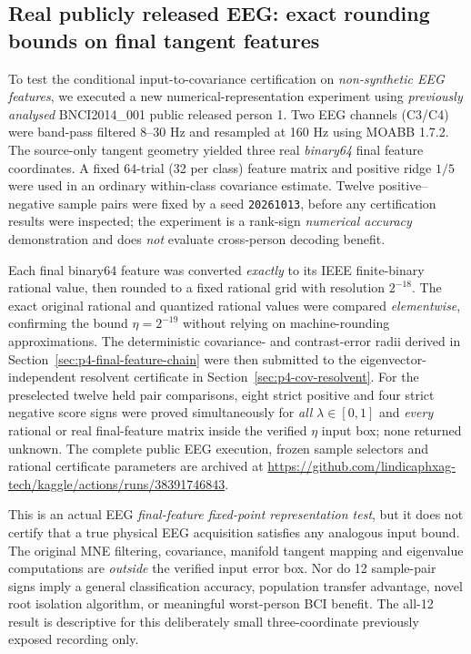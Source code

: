\subsection{Real publicly released EEG: exact rounding bounds on final tangent features}
\label{sec:p4-real-feature-quantisation}
To test the conditional input-to-covariance certification
on \emph{non-synthetic EEG features}, we executed a
new numerical-representation experiment using
\emph{previously analysed} BNCI2014\_001
public released person 1.
Two EEG channels (C3/C4) were band-pass filtered
8--30 Hz and resampled at 160 Hz using
MOABB 1.7.2. The source-only tangent geometry
yielded three real \emph{binary64} final feature
coordinates. A fixed 64-trial (32 per class)
feature matrix and positive ridge $1/5$
were used in an ordinary within-class
covariance estimate. Twelve positive--negative
sample pairs were fixed by a seed
\texttt{20261013}, before any certification
results were inspected; the experiment is
a rank-sign \emph{numerical accuracy}
demonstration and does \emph{not} evaluate
cross-person decoding benefit.

Each final binary64 feature was converted
\emph{exactly} to its IEEE finite-binary
rational value, then rounded to a fixed
rational grid with resolution $2^{-18}$.
The exact original rational and quantized
rational values were compared
\emph{elementwise}, confirming the bound
$\eta=2^{-19}$ without relying on
machine-rounding approximations.
The deterministic covariance- and
contrast-error radii derived in
Section~\ref{sec:p4-final-feature-chain}
were then submitted to the eigenvector-
independent resolvent certificate in
Section~\ref{sec:p4-cov-resolvent}.
For the preselected twelve held pair
comparisons, eight strict positive
and four strict negative score signs
were proved simultaneously for
\emph{all} $\lambda\in[0,1]$ and
\emph{every} rational or real
final-feature matrix inside the
verified $\eta$ input box; none
returned unknown. The complete
public EEG execution, frozen
sample selectors and rational
certificate parameters are archived at
\url{https://github.com/lindicaphxag-tech/kaggle/actions/runs/38391746843}.

This is an actual EEG \emph{final-feature
fixed-point representation test},
but it does not certify that a
true physical EEG acquisition
satisfies any analogous input
bound. The original MNE filtering,
covariance, manifold tangent mapping
and eigenvalue computations
are \emph{outside} the verified
input error box. Nor do 12
sample-pair signs imply a general
classification accuracy, population
transfer advantage, novel root
isolation algorithm, or meaningful
worst-person BCI benefit.
The all-12 result is descriptive
for this deliberately small
three-coordinate previously exposed
recording only.
